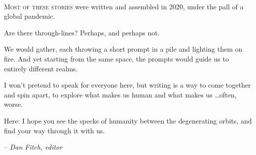 \pagestyle{plain}

\begingroup%
\centering
\vspace*{24pt}
{}\\[\baselineskip]
\vfill\null
\endgroup



\renewcommand{\contentsname}{}

{\setlength{\beforechapskip}{0pt}
\begin{KeepFromToc}
  \tableofcontents*
\end{KeepFromToc}
}

\vfill
\specsep{}

\lettrine{M}{ost of these stories} were written and assembled in 2020, under the pall of a global pandemic.

Are there through-lines? Perhaps, and perhaps not.

We would gather, each throwing a short prompt in a pile and lighting them on fire. And yet starting from the same space, the prompts would guide us to entirely different realms.

I won't pretend to speak for everyone here, but writing is a way to come together and spin apart, to explore what makes us human and what makes us \ldots often, worse.

Here: I hope you see the specks of humanity between the degenerating orbits, and find your way through it with us.

\vspace{1em}

\hfill-- \emph{Dan Fitch, editor}


\clearpage

